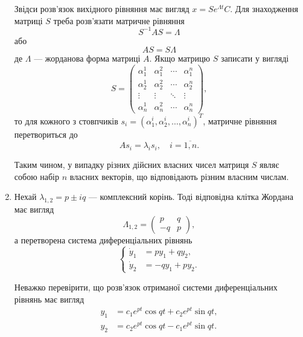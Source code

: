 \begin{enumerate}
Звідси розв’язок вихідного рівняння має вигляд $x = S e^{\Lambda t} C$. Для знаходження матриці $S$ треба розв’язати матричне рівняння
\begin{equation*}
	S^{-1} A S = \Lambda
\end{equation*}
або
\begin{equation*}
	A S = S \Lambda
\end{equation*}
де $\Lambda$ --- жорданова форма матриці $A$. Якщо матрицю $S$ записати у вигляді
\begin{equation*}
	S = 
	\begin{pmatrix} 
		\alpha_1^1 & \alpha_1^2 & \cdots & \alpha_1^n \\
		\alpha_2^1 & \alpha_2^2 & \cdots & \alpha_2^n \\
		\vdots & \vdots & \ddots & \vdots \\
		\alpha_n^1 & \alpha_n^2 & \cdots & \alpha_n^n
	\end{pmatrix},
\end{equation*}
то для кожного з стовпчиків $s_i = (\alpha_1^i, \alpha_2^i, \ldots, \alpha_n^i)^T$, матричне рівняння перетвориться до
\begin{equation*}
	A s_i = \lambda_i s_i, \quad i = \overline{1, n}.
\end{equation*}

Таким чином, у випадку різних дійсних власних чисел матриця $S$ являє собою набір $n$ власних векторів, що відповідають різним власним числам.

\item Нехай $\lambda_{1,2} = p \pm i q$ --- комплексний корінь. Тоді відповідна клітка Жордана має вигляд
\begin{equation*}
	\Lambda_{1,2} = \begin{pmatrix} p & q \\ -q & p \end{pmatrix},
\end{equation*}
а перетворена система диференціальних рівнянь
\begin{equation*}
	\left\{
		\begin{aligned}
			\dot y_1 &= p y_1 + q y_2, \\
			\dot y_2 &= - q y_1 + p y_2.
		\end{aligned}
	\right.
\end{equation*}

Неважко перевірити, що розв’язок отриманої системи диференціальних рівнянь має вигляд
\begin{align*}
	y_1 &= c_1 e^{pt} \cos  qt + c_2 e^{pt} \sin qt, \\
	y_2 &= c_2 e^{pt} \cos  qt - c_1 e^{pt} \sin qt.
\end{align*}


\end{enumerate}
